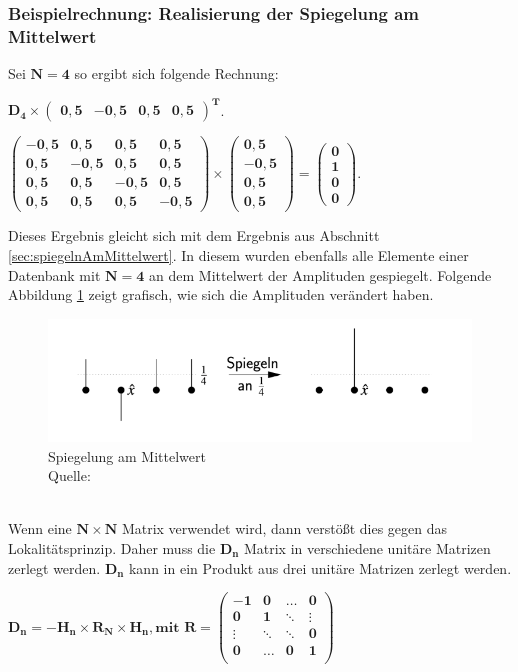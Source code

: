 \subsubsection{Beispielrechnung: Realisierung der Spiegelung am Mittelwert}
\label{seg:bspSpiegelungAmMittelwert}
Sei $\mathbf{N = 4}$ so ergibt sich folgende Rechnung:
\begin{center}
 $\mathbf{D_4  \times \begin{pmatrix}
		0,5 & -0,5 & 0,5 & 0,5
\end{pmatrix}^T}$.

$\mathbf{\begin{pmatrix}
		-0,5 & 0,5 &0,5&0,5\\
		0,5 & -0,5 &0,5&0,5\\
		0,5 & 0,5 &-0,5&0,5\\
		0,5 & 0,5 &0,5&-0,5
	\end{pmatrix}
	\times \begin{pmatrix} 0,5 \\ -0,5 \\ 0,5 \\ 0,5 \end{pmatrix} = \begin{pmatrix} 0\\1\\0\\0 \end{pmatrix}
}$.
\end{center}
Dieses Ergebnis gleicht sich mit dem Ergebnis aus Abschnitt \ref{sec:spiegelnAmMittelwert}. In diesem wurden ebenfalls alle Elemente einer Datenbank mit $\mathbf{N=4}$ an dem Mittelwert der Amplituden gespiegelt. Folgende Abbildung \ref{fig:spiegelung} zeigt grafisch, wie sich die Amplituden verändert haben.
\begin{figure}[hbtp]
	\centering
	\includegraphics[width=.8\textwidth]{figures/spiegelung.png}
	\caption{Spiegelung am Mittelwert \\ Quelle: \cite[S. 142]{Ho17}}
	\label{fig:spiegelung}
\end{figure}
\noindent
\\
Wenn eine $\mathbf{N \times N}$ Matrix verwendet wird, dann verstößt dies gegen das Lokalitätsprinzip. Daher muss die $\mathbf{D_n}$ Matrix in verschiedene unitäre Matrizen zerlegt werden.  $\mathbf{D_n}$ kann in ein Produkt aus drei unitäre Matrizen zerlegt werden.
\begin{center}
$\mathbf{D_n = -H_n \times R_N \times H_n, \text{mit } R  = 
\begin{pmatrix}
		-1 & 0 &\dots& 0 \\
		0& 1& \ddots& \vdots\\
		\vdots &\ddots& \ddots&0 \\
		0& \dots& 0 &1 \\
\end{pmatrix}}$
\end{center}
